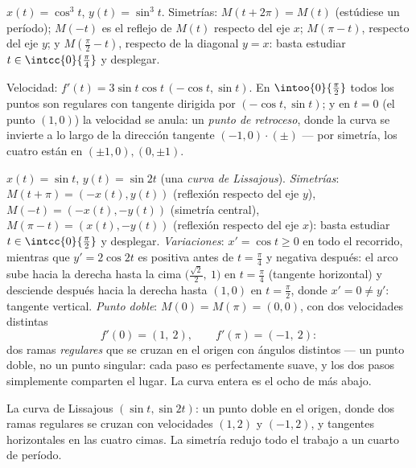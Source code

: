 \begin{example}[La astroide]\label{ex:b1:curves:astroid}
$x(t) = \cos^3 t$, $y(t) = \sin^3 t$. Simetrías:
$M(t + 2\pi) = M(t)$ (estúdiese un período); $M(-t)$ es el reflejo de
$M(t)$ respecto del eje $x$; $M(\pi - t)$, respecto del eje $y$; y
$M(\frac\pi2 - t)$, respecto de la diagonal $y = x$: basta estudiar
$t \in \intcc{0}{\frac\pi4}$ y desplegar.

Velocidad: $f'(t) = 3\sin t\cos t\,(-\cos t, \sin t)$. En
$\intoo{0}{\frac\pi2}$ todos los puntos son regulares con tangente
dirigida por $(-\cos t, \sin t)$; y en $t = 0$ (el punto $(1,0)$) la
velocidad se anula: un \emph{punto de retroceso}, donde la curva se invierte a lo largo de la dirección
tangente $(-1, 0)\cdot(\pm)$ --- por simetría, los cuatro
 están en $(\pm1, 0), (0, \pm1)$.
\end{example}

\begin{example}
\label{ex:b1:curves:lissajous}
$x(t) = \sin t$, $y(t) = \sin 2t$ (una \emph{curva de Lissajous}).
\emph{Simetrías}: $M(t + \pi) = (-x(t), y(t))$ (reflexión respecto
del eje $y$), $M(-t) = (-x(t), -y(t))$ (simetría central),
$M(\pi - t) = (x(t), -y(t))$ (reflexión respecto del eje $x$): basta
estudiar $t \in \intcc{0}{\frac\pi2}$ y desplegar.
\emph{Variaciones}: $x' = \cos t \geq 0$ en todo el recorrido,
mientras que $y' = 2\cos 2t$ es positiva antes de $t = \frac\pi4$ y
negativa después: el arco sube hacia la derecha hasta la cima
$\bigl(\frac{\sqrt2}2,\ 1\bigr)$ en $t = \frac\pi4$ (tangente
horizontal) y desciende después hacia la derecha hasta $(1, 0)$ en
$t = \frac\pi2$, donde $x' = 0 \neq y'$: tangente vertical.
\emph{Punto doble}: $M(0) = M(\pi) = (0,0)$, con dos velocidades
distintas
\[
f'(0) = (1,\ 2), \qquad f'(\pi) = (-1,\ 2) :
\]
dos ramas \emph{regulares} que se cruzan en el origen con ángulos
distintos --- un punto doble, no un punto singular: cada paso es
perfectamente suave, y los dos pasos simplemente comparten el lugar.
La curva entera es el ocho de más abajo.
\end{example}

\begin{omfigure}

{\small La curva de Lissajous $(\sin t, \sin 2t)$: un punto doble en
el origen, donde dos ramas regulares se cruzan con velocidades
$(1, 2)$ y $(-1, 2)$, y tangentes horizontales en las cuatro cimas.
La simetría redujo todo el trabajo a un cuarto de período.}
\end{omfigure}

